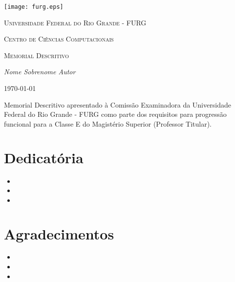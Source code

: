 \documentclass[12pt,a4paper,final,oneside]{book}
\begin{document}
\frontmatter
\begin{titlepage}
	\centering
	\texttt{[image: furg.eps]}\par\vspace{1cm}
	{\scshape\LARGE Universidade Federal do Rio Grande - FURG \par}
	\vspace{0.5cm}
	{\scshape\Large  Centro de Ciências Computacionais\par}
		\vspace{5cm}
	{\scshape\LARGE Memorial Descritivo\par}
	\vspace{2cm}
	{\Large\itshape Nome Sobrenome Autor\par}
	\vfill
	{\large \today\par}
\end{titlepage}


\newenvironment{acknowledgements}%
    {\cleardoublepage\thispagestyle{empty}\null\vfill}%
    {\vfill\null}
        \begin{acknowledgements}
       Memorial Descritivo apresentado à Comissão Examinadora da Universidade Federal
do Rio Grande - FURG como parte dos requisitos para progressão funcional para a
Classe E do Magistério Superior (Professor Titular).
        \end{acknowledgements}
        



\chapter{Dedicatória}

\begin{itemize}
\item \lipsum [1]
\item \lipsum [2]
\item \lipsum [3]


\end{itemize}

\chapter{Agradecimentos}

\begin{itemize}

\item \lipsum [4]
\item \lipsum [5]
\item \lipsum [6]


\end{itemize}
\end{document}
